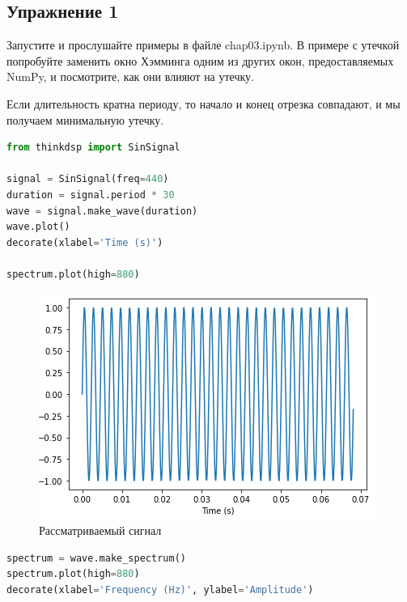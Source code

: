 \subsection{Упражнение 1}

Запустите и прослушайте примеры в файле chap03.ipynb. В примере с утечкой попробуйте заменить окно Хэмминга одним из других окон, предоставляемых NumPy, и посмотрите, как они влияют на утечку.

Если длительность кратна периоду, то начало и конец отрезка совпадают, и мы получаем минимальную утечку.

\begin{lstlisting}[language=Python]
from thinkdsp import SinSignal

signal = SinSignal(freq=440)
duration = signal.period * 30
wave = signal.make_wave(duration)
wave.plot()
decorate(xlabel='Time (s)')

spectrum.plot(high=880)
\end{lstlisting}

\begin{figure}[H]
	\begin{center}
		\includegraphics[scale=1]{fig/lab03/lab03_01.png}
		\caption{Рассматриваемый сигнал}
	\end{center}
\end{figure}

\begin{lstlisting}[language=Python]
spectrum = wave.make_spectrum()
spectrum.plot(high=880)
decorate(xlabel='Frequency (Hz)', ylabel='Amplitude')
\end{lstlisting}

